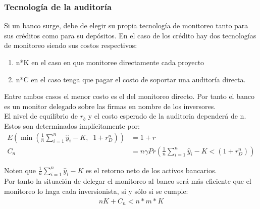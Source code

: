\documentclass[10pt, xcolor=table, x11names]{beamer}
\begin{document}
\begin{frame}
    \frametitle{{\normalsize Tecnología de la auditoría} {}}
    
    Si un banco surge, debe de elegir su propia tecnología de monitoreo tanto para sus créditos como para su depósitos. En el caso de los crédito hay dos tecnologías de monitoreo siendo sus costos respectivos:
    \begin{enumerate}
        \item n*K en el caso en que monitoree directamente cada proyecto
        \item n*C en el caso tenga que pagar el costo de soportar una auditoría directa.
    \end{enumerate}
    Entre ambos casos el menor costo es el del monitoreo directo. Por tanto el banco es un monitor delegado sobre las firmas en nombre de los inversores. \\
    El nivel de equilibrio de $r_{b} $ y el costo esperado de la auditoria dependerá de n. Estos son determinados implícitamente por:
    \begin{align}
    E(\min(\frac{1}{n}\sum_{i=1}^{n}\hat{y}_{i}-K,\; \; 1+r_{D}^{n}))&=1+r \\
    C_{n}&=n\gamma Pr(\frac{1}{n}\sum_{i=1}^{n}\hat{y}_{i}-K<(1+r_{D}^{n}))
    \end{align}
    
    Noten que $\frac{1}{n}\sum_{i=1}^{n}\hat{y}_{i}-K $ es el retorno neto de los activos bancarios.\\
    
    Por tanto la situación de delegar el monitoreo al banco será más eficiente que el monitoreo lo haga cada inversionista, si y sólo si se cumple:
    \begin{align}
    nK+C_{n}<n*m*K \nonumber 
    \end{align}
    
\end{frame}
\end{document}
